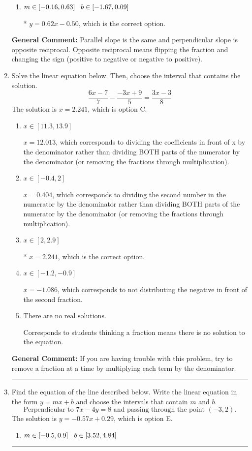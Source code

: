 \documentclass{extbook}[14pt]
\newcommand{\litem}[1]{\item #1

\rule{\textwidth}{0.4pt}}
\begin{document}
\begin{enumerate}
{\begin{enumerate}[label=\Alph*.]
 $y = 0.62x + 0.50$, which corresponds to using the correct slope and getting the negative $y$-intercept.
\item \( m \in [-0.16, 0.63] \hspace*{3mm} b \in [-1.67, 0.09] \)

* $y = 0.62x - 0.50$, which is the correct option.
\end{enumerate}

\textbf{General Comment:} Parallel slope is the same and perpendicular slope is opposite reciprocal. Opposite reciprocal means flipping the fraction and changing the sign (positive to negative or negative to positive).
}
\litem{
Solve the linear equation below. Then, choose the interval that contains the solution.
\[ \frac{6x -7}{7} - \frac{-3x + 9}{5} = \frac{3x -3}{8} \]The solution is \( x = 2.241 \), which is option C.\begin{enumerate}[label=\Alph*.]
\item \( x \in [11.3, 13.9] \)

 $x = 12.013$, which corresponds to dividing the coefficients in front of x by the denominator rather than dividing BOTH parts of the numerator by the denominator (or removing the fractions through multiplication).
\item \( x \in [-0.4, 2] \)

 $x = 0.404$, which corresponds to dividing the second number in the numerator by the denominator rather than dividing BOTH parts of the numerator by the denominator (or removing the fractions through multiplication).
\item \( x \in [2, 2.9] \)

* $x = 2.241$, which is the correct option.
\item \( x \in [-1.2, -0.9] \)

 $x = -1.086$, which corresponds to not distributing the negative in front of the second fraction.
\item \( \text{There are no real solutions.} \)

Corresponds to students thinking a fraction means there is no solution to the equation.
\end{enumerate}

\textbf{General Comment:} If you are having trouble with this problem, try to remove a fraction at a time by multiplying each term by the denominator.
}
\litem{
Find the equation of the line described below. Write the linear equation in the form $ y=mx+b $ and choose the intervals that contain $m$ and $b$.
\[ \text{Perpendicular to } 7 x - 4 y = 8 \text{ and passing through the point } (-3, 2). \]The solution is \( y = -0.57x + 0.29 \), which is option E.\begin{enumerate}[label=\Alph*.]
\item \( m \in [-0.5, 0.9] \hspace*{3mm} b \in [3.52, 4.84] \)


\end{enumerate}}
\end{enumerate}
\end{document}
